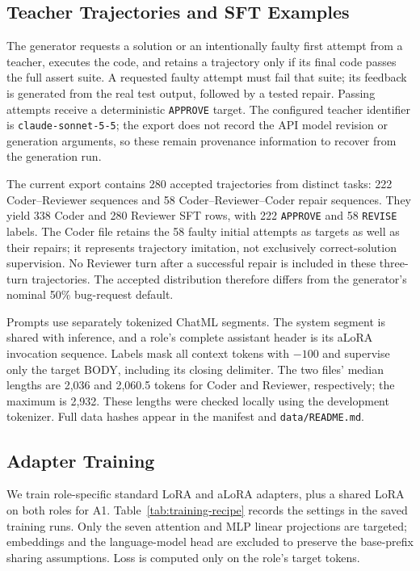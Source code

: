 \documentclass[10pt,twocolumn,letterpaper]{article}
\begin{document}
\subsection{Teacher Trajectories and SFT Examples}
The generator requests a solution or an intentionally faulty first attempt
from a teacher, executes the code, and retains a trajectory only if its final
code passes the full assert suite. A requested faulty attempt must fail that
suite; its feedback is generated from the real test output, followed by a
tested repair. Passing attempts receive a deterministic \texttt{APPROVE}
target. The configured teacher identifier is \texttt{claude-sonnet-5-5}; the
export does not record the API model revision or generation arguments, so
these remain provenance information to recover from the generation run.

The current export contains 280 accepted trajectories from distinct tasks:
222 Coder--Reviewer sequences and 58 Coder--Reviewer--Coder repair sequences.
They yield 338 Coder and 280 Reviewer SFT rows, with 222 \texttt{APPROVE} and
58 \texttt{REVISE} labels. The Coder file retains the 58 faulty initial
attempts as targets as well as their repairs; it represents trajectory
imitation, not exclusively correct-solution supervision. No Reviewer turn
after a successful repair is included in these three-turn trajectories.
The accepted distribution therefore differs from the generator's nominal
50\% bug-request default.

Prompts use separately tokenized ChatML segments. The system segment is shared
with inference, and a role's complete assistant header is its aLoRA invocation
sequence. Labels mask all context tokens with $-100$ and supervise only the
target BODY, including its closing delimiter. The two files' median lengths
are 2,036 and 2,060.5 tokens for Coder and Reviewer, respectively; the maximum
is 2,932. These lengths were checked locally using the development tokenizer.
Full data hashes appear in the manifest and \texttt{data/README.md}.

\subsection{Adapter Training}
We train role-specific standard LoRA and aLoRA adapters,
plus a shared LoRA on both roles for A1. Table~\ref{tab:training-recipe}
records the settings in the saved training runs. Only the seven attention and MLP linear
projections are targeted; embeddings and the language-model head are excluded
to preserve the base-prefix sharing assumptions. Loss is computed only on
the role's target tokens.
\end{document}

